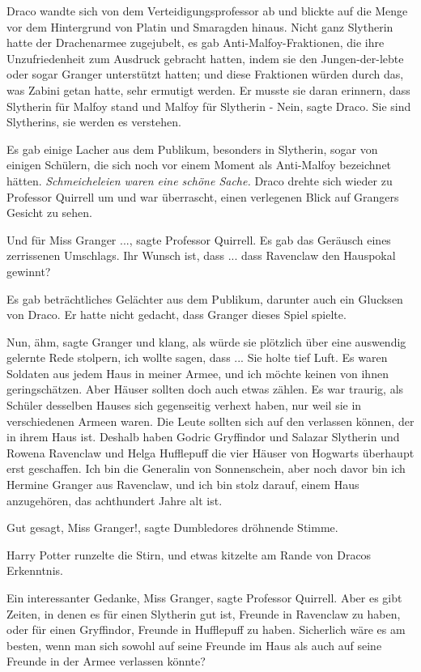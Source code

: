 Draco wandte sich von dem Verteidigungsprofessor ab und blickte auf die Menge
vor dem Hintergrund von Platin und Smaragden hinaus. Nicht ganz Slytherin hatte
der Drachenarmee zugejubelt, es gab Anti-Malfoy-Fraktionen, die ihre
Unzufriedenheit zum Ausdruck gebracht hatten, indem sie den Jungen-der-lebte
oder sogar Granger unterstützt hatten; und diese Fraktionen würden durch das,
was Zabini getan hatte, sehr ermutigt werden. Er musste sie daran erinnern, dass
Slytherin für Malfoy stand und Malfoy für Slytherin - \glqq{}Nein\grqq{}, sagte
Draco. \glqq{}Sie sind Slytherins, sie werden es verstehen.\grqq{}

Es gab einige Lacher aus dem Publikum, besonders in Slytherin, sogar von einigen
Schülern, die sich noch vor einem Moment als Anti-Malfoy bezeichnet hätten.
\emph{Schmeicheleien waren eine schöne Sache.} Draco drehte sich wieder zu
Professor Quirrell um und war überrascht, einen verlegenen Blick auf Grangers
Gesicht zu sehen.

\glqq{}Und für Miss Granger ...\grqq{}, sagte Professor Quirrell. Es gab das
Geräusch eines zerrissenen Umschlags. \glqq{}Ihr Wunsch ist, dass ... dass
Ravenclaw den Hauspokal gewinnt?\grqq{}

Es gab beträchtliches Gelächter aus dem Publikum, darunter auch ein Glucksen von
Draco. Er hatte nicht gedacht, dass Granger dieses Spiel spielte.

\glqq{}Nun, ähm\grqq{}, sagte Granger und klang, als würde sie plötzlich über
eine auswendig gelernte Rede stolpern, \glqq{}ich wollte sagen, dass ...\grqq{} Sie
holte tief Luft. \glqq{}Es waren Soldaten aus jedem Haus in meiner Armee, und ich
möchte keinen von ihnen geringschätzen. Aber Häuser sollten doch auch etwas
zählen. Es war traurig, als Schüler desselben Hauses sich gegenseitig verhext
haben, nur weil sie in verschiedenen Armeen waren. Die Leute sollten sich auf
den verlassen können, der in ihrem Haus ist. Deshalb haben Godric Gryffindor und
Salazar Slytherin und Rowena Ravenclaw und Helga Hufflepuff die vier Häuser von
Hogwarts überhaupt erst geschaffen. Ich bin die Generalin von Sonnenschein, aber
noch davor bin ich Hermine Granger aus Ravenclaw, und ich bin stolz darauf,
einem Haus anzugehören, das achthundert Jahre alt ist.\grqq{}

\glqq{}Gut gesagt, Miss Granger!\grqq{}, sagte Dumbledores dröhnende Stimme.

Harry Potter runzelte die Stirn, und etwas kitzelte am Rande von Dracos
Erkenntnis.

\glqq{}Ein interessanter Gedanke, Miss Granger\grqq{}, sagte Professor Quirrell.
\glqq{}Aber es gibt Zeiten, in denen es für einen Slytherin gut ist, Freunde in
Ravenclaw zu haben, oder für einen Gryffindor, Freunde in Hufflepuff zu haben.
Sicherlich wäre es am besten, wenn man sich sowohl auf seine Freunde im Haus als
auch auf seine Freunde in der Armee verlassen könnte?\grqq{}

